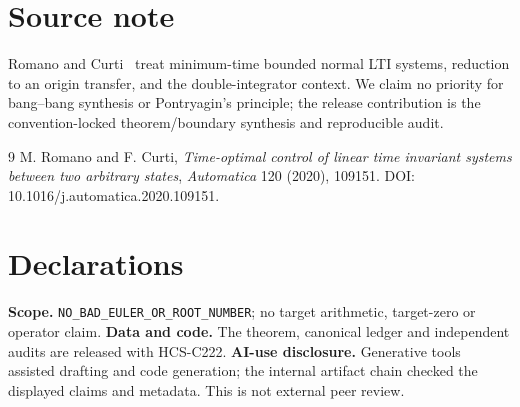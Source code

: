 \documentclass[11pt]{article}
\begin{document}
\section*{Source note}
Romano and Curti~\cite{romano2020} treat minimum-time bounded normal LTI
systems, reduction to an origin transfer, and the double-integrator context.
We claim no priority for bang--bang synthesis or Pontryagin's principle; the
release contribution is the convention-locked theorem/boundary synthesis and
reproducible audit.

\begin{thebibliography}{9}
 M. Romano and F. Curti, \textit{Time-optimal control of
linear time invariant systems between two arbitrary states},
\emph{Automatica} 120 (2020), 109151.
DOI: 10.1016/j.automatica.2020.109151.
\end{thebibliography}

\section*{Declarations}
\textbf{Scope.} \texttt{NO\_BAD\_EULER\_OR\_ROOT\_NUMBER}; no target
arithmetic, target-zero or operator claim.  \textbf{Data and code.} The
theorem, canonical ledger and independent audits are released with HCS-C222.
\textbf{AI-use disclosure.} Generative tools assisted drafting and code
generation; the internal artifact chain checked the displayed claims and
metadata.  This is not external peer review.
\end{document}
